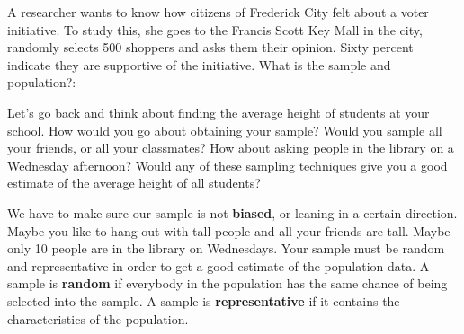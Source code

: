 \begin{try}
A researcher wants to know how citizens of Frederick City felt about a voter initiative. To study this, she goes to the Francis Scott Key Mall in the city, randomly selects 500 shoppers and asks them their opinion. Sixty percent indicate they are supportive of the initiative. What is the sample and population?:
\end{try}

Let's go back and think about finding the average height of students at your school. How would you go about obtaining your sample? Would you sample all your friends, or all your classmates? How about asking people in the library on a Wednesday afternoon? Would any of these sampling techniques give you a good estimate of the average height of all students? 


We have to make sure our sample is not \textbf{biased}, or leaning in a certain direction. Maybe you like to hang out with tall people and all your friends are tall. Maybe only 10 people are in the library on Wednesdays. Your sample must be random and representative in order to get a good estimate of the population data.  A sample is \textbf{random} if everybody in the population has the same chance of being selected into the sample. A sample is \textbf{representative} if it contains the characteristics of the population.

